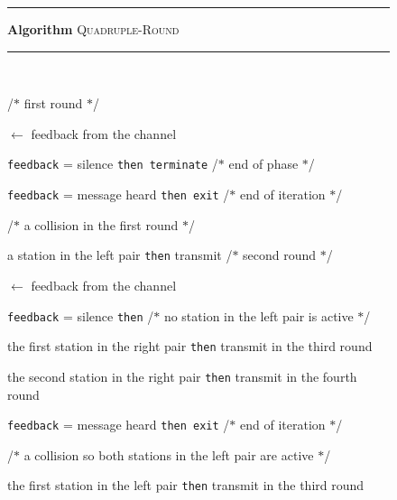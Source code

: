 \documentclass[11pt]{article}
\newcommand{\F}{\vspace*{\smallskipamount}}
\newcommand{\B}{\vspace*{-\smallskipamount}}
\newcommand{\Item}{\B\item}
\newlength{\pagewidth}
\begin{document}
\begin{figure}[t]
\rule{\textwidth}{0.75pt}

\F 
\textbf{Algorithm} \textsc{Quadruple-Round} 

\rule{\textwidth}{0.75pt}
\begin{center}
\begin{minipage}{\pagewidth}

\begin{description}

\Item[\tt repeat] ~
\B
\begin{description}

\Item[\rm transmit] /$\ast$ first round $\ast$/

\Item[\tt feedback] $\leftarrow$ feedback from the channel 

\Item[\tt if] \texttt{feedback} = silence \texttt{then terminate} /$\ast$ end of phase $\ast$/

\Item[\tt else if] \texttt{feedback} = message heard  \texttt{then exit} /$\ast$ end of iteration $\ast$/

\Item[\tt else] /$\ast$ a collision in the first round $\ast$/

\begin{description}

\Item[\tt if] a station in the left pair \texttt{then} transmit  /$\ast$ second round $\ast$/

\Item[\tt feedback] $\leftarrow$ feedback from the channel 

\Item[\tt if] \texttt{feedback} = silence \texttt{then} /$\ast$ no  station in the left pair is active $\ast$/

\begin{description}

\Item[\tt if] the first station in the right pair \texttt{then} transmit in the third round

\Item[\tt else if] the second station in the right pair \texttt{then} transmit in the fourth round

\end{description}

\Item[\tt else if] \texttt{feedback} = message heard \texttt{then exit} /$\ast$ end of iteration $\ast$/

\Item[\tt else] /$\ast$ a collision so both stations in the left pair are active $\ast$/

\begin{description}

\Item[\tt if] the first station in the left pair \texttt{then} transmit in the third round


\end{description}
\end{description}
\end{description}
\end{description}
\end{minipage}
\end{center}
\end{figure}
\end{document}
